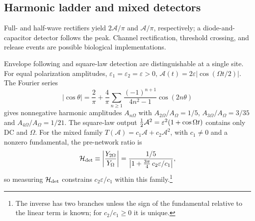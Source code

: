 \subsection{Harmonic ladder and mixed detectors}\label{supp:harmonics}
Full- and half-wave rectifiers yield $2\mathcal A/\pi$ and
$\mathcal A/\pi$, respectively; a diode-and-capacitor detector follows the
peak. Channel rectification, threshold crossing, and release events are
possible biological implementations.

Envelope following and square-law detection are distinguishable at a single site.
For equal polarization amplitudes, $\varepsilon_1=\varepsilon_2=\varepsilon>0$, $\mathcal A(t)=2\varepsilon|\cos(\Omega t/2)|$.
The Fourier series
\[
|\cos\theta|=\frac{2}{\pi}+\frac{4}{\pi}\sum_{n\ge1}\frac{(-1)^{n+1}}{4n^2-1}\cos(2n\theta)
\]
gives nonnegative harmonic amplitudes $A_{n\Omega}$ with $A_{2\Omega}/A_\Omega=1/5$, $A_{3\Omega}/A_\Omega=3/35$ and
$A_{4\Omega}/A_\Omega=1/21$. The square-law output $\tfrac{1}{2} \mathcal A^2=\varepsilon^2(1+\cos\Omega
t)$ contains only DC and $\Omega$. For the mixed family $T(\mathcal A)=c_1\mathcal A+c_2\mathcal A^2$, with
$c_1\ne0$ and a nonzero fundamental, the
pre-network ratio is
\begin{equation}
\mathcal H_{\rm det}\equiv\left|\frac{Y_{2\Omega}}{Y_\Omega}\right|
=\frac{1/5}{\left|1+\tfrac{3\pi}{4}\,c_2\varepsilon/c_1\right|},
\label{eq:rdet}
\end{equation}
so measuring $\mathcal H_{\rm det}$ constrains $c_2\varepsilon/c_1$ within this family.\footnote{The inverse has two branches unless the sign of the fundamental
relative to the linear term is known; for $c_2/c_1\ge0$ it is unique.}

